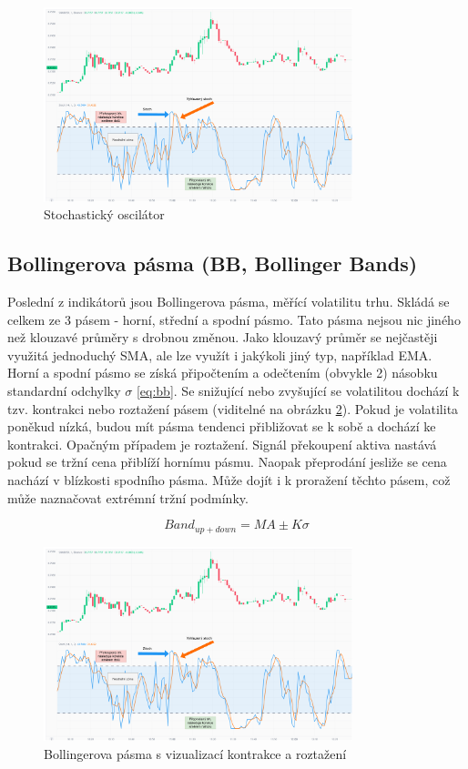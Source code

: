\begin{figure}[ht]
    \centering
    \includegraphics[width=0.8\textwidth]{Figures/Stoch.pdf}
    \caption{Stochastický oscilátor}
    \label{fig:stoch}
\end{figure}

\subsection{Bollingerova pásma (BB, Bollinger Bands)}
Poslední z indikátorů jsou Bollingerova pásma, měřící volatilitu trhu. Skládá se celkem ze 3 pásem - horní, střední a spodní pásmo. Tato pásma nejsou nic jiného než klouzavé průměry
s drobnou změnou. Jako klouzavý průměr se nejčastěji využitá jednoduchý SMA, ale lze využít i jakýkoli jiný typ, například EMA. Horní a spodní pásmo se získá připočtením a odečtením
(obvykle 2) násobku standardní odchylky $\sigma$ \ref{eq:bb}. Se snižující nebo zvyšující se volatilitou dochází k tzv. kontrakci nebo roztažení pásem (viditelné na obrázku \ref{fig:bb}).
Pokud je volatilita poněkud nízká, budou mít
pásma tendenci přibližovat se k sobě a dochází ke kontrakci. Opačným případem je roztažení. Signál překoupení aktiva nastává pokud se tržní cena přiblíží hornímu pásmu. Naopak přeprodání
jesliže se cena nachází v blízkosti spodního pásma. Může dojít i k proražení těchto pásem, což může naznačovat extrémní tržní podmínky.

\begin{equation}
    Band_{up + down} = MA \pm K\sigma
    \label{eq:bb}
\end{equation}

\begin{figure}[ht]
    \centering
    \includegraphics[width=0.8\textwidth]{Figures/Stoch.pdf}
    \caption{Bollingerova pásma s vizualizací kontrakce a roztažení}
    \label{fig:bb}
\end{figure}


\endinput